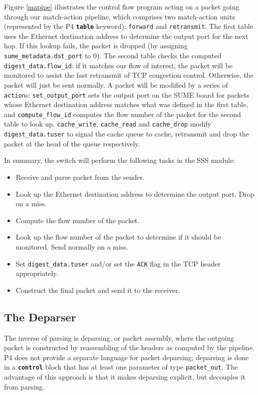 Figure \ref{mapipe} illustrates the control flow program acting on a packet going through our match-action pipeline, which comprises two match-action units (represented by the P4 \textbf{\texttt{table}} keyword): \texttt{forward} and \texttt{retransmit}.
The first table uses the Ethernet destination address to determine the output port for the next hop. If this lookup fails, the packet is dropped (by assigning \texttt{sume\_metadata.dst\_port} to 0). The second table checks the computed \texttt{digest\_data.flow\_id}: if it matches our flow of interest, the packet will be monitored to assist the fast retransmit of TCP congestion control. Otherwise, the packet will just be sent normally. A packet will be modified by a series of \texttt{action}s: \texttt{set\_output\_port} sets the output port on the SUME board for packets whose Ethernet destination address matches what was defined in the first table, and \texttt{compute\_flow\_id} computes the flow number of the packet for the second table to look up. \texttt{cache\_write}, \texttt{cache\_read} and \texttt{cache\_drop} modify \texttt{digest\_data.tuser} to signal the cache queue to cache, retransmit and drop the packet at the head of the queue respectively.
		
In summary, the switch will perform the following tasks in the SSS module:
\begin{itemize}
	\item Receive and parse packet from the sender.
	\item Look up the Ethernet destination address to determine the output port. Drop on a miss.
	\item Compute the flow number of the packet.
	\item Look up the flow number of the packet to determine if it should be monitored. Send normally on a miss.
	\item Set \texttt{digest\_data.tuser} and/or set the \texttt{ACK} flag in the TCP header appropriately.
	\item Construct the final packet and send it to the receiver.
\end{itemize}

	\subsection{The Deparser}
The inverse of parsing is deparsing, or packet assembly, where the outgoing packet is constructed by reassembling of the headers as computed by the pipeline. P4 does not provide a separate language for packet deparsing; deparsing is done in a \textbf{\texttt{control}} block that has at least one parameter of type \verb|packet_out|. The advantage of this approach is that it makes deparsing explicit, but decouples it from parsing. 

